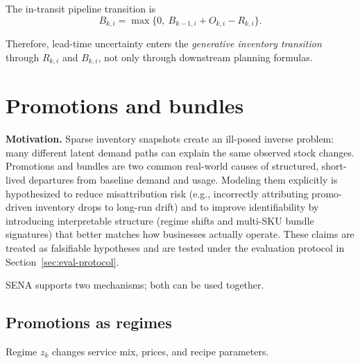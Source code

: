 \documentclass[11pt]{article}
\begin{document}
The in-transit pipeline transition is
\[
  B_{k,i}=\max\bigl\{0,\ B_{k-1,i}+O_{k,i}-R_{k,i}\bigr\}.
\]

Therefore, lead-time uncertainty enters the \emph{generative inventory transition} through $R_{k,i}$ and $B_{k,i}$, not only through downstream planning formulas.

\section{Promotions and bundles}

\textbf{Motivation.} Sparse inventory snapshots create an ill-posed inverse problem: many different latent demand paths can explain the same observed stock changes.
Promotions and bundles are two common real-world causes of structured, short-lived departures from baseline demand and usage.
Modeling them explicitly is hypothesized to reduce misattribution risk (e.g., incorrectly attributing promo-driven inventory drops to long-run drift) and to improve identifiability by introducing interpretable structure (regime shifts and multi-SKU bundle signatures) that better matches how businesses actually operate.
These claims are treated as falsifiable hypotheses and are tested under the evaluation protocol in Section~\ref{sec:eval-protocol}.

SENA supports two mechanisms; both can be used together.

\subsection{Promotions as regimes}

Regime $z_k$ changes service mix, prices, and recipe parameters.
\end{document}
